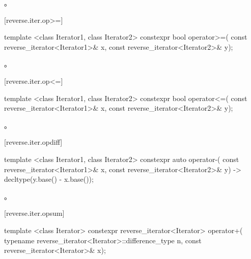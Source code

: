 \begin{itemdescr}
\pnum
\returns
{}。
\end{itemdescr}

[reverse.iter.op>=]{}

%
\begin{itemdecl}
template <class Iterator1, class Iterator2>
  constexpr bool operator>=(
    const reverse_iterator<Iterator1>& x,
    const reverse_iterator<Iterator2>& y);
\end{itemdecl}

\begin{itemdescr}
\pnum
\returns
{}。
\end{itemdescr}

[reverse.iter.op<=]{}

%
\begin{itemdecl}
template <class Iterator1, class Iterator2>
  constexpr bool operator<=(
    const reverse_iterator<Iterator1>& x,
    const reverse_iterator<Iterator2>& y);
\end{itemdecl}

\begin{itemdescr}
\pnum
\returns
{}。
\end{itemdescr}

[reverse.iter.opdiff]{}

%
\begin{itemdecl}
template <class Iterator1, class Iterator2>
    constexpr auto operator-(
    const reverse_iterator<Iterator1>& x,
    const reverse_iterator<Iterator2>& y) -> decltype(y.base() - x.base());
\end{itemdecl}

\begin{itemdescr}
\pnum
\returns
{}。
\end{itemdescr}

[reverse.iter.opsum]{}

%
\begin{itemdecl}
template <class Iterator>
  constexpr reverse_iterator<Iterator> operator+(
    typename reverse_iterator<Iterator>::difference_type n,
    const reverse_iterator<Iterator>& x);
\end{itemdecl}

